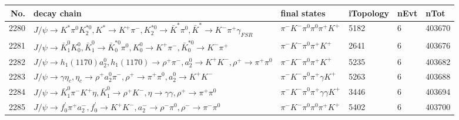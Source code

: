 \begin{table}[htbp] 
\begin{center}
\begin{small}
\begin{tabular}{rlllll}\hline\hline
 No. & decay chain & final states &  iTopology & nEvt & nTot \\\hline
2280&$J/\psi       \rightarrow K^{*}          \pi^{0}        K_2^{*0}       , K^{*}           \rightarrow K^{+}          \pi^{-}        , K_2^{*0}        \rightarrow \bar{K}^{*}   \pi^{0}        , \bar{K}^{*}    \rightarrow K^{-}          \pi^{+}        \gamma_{FSR} $&$\pi^{-}        K^{-}          \pi^{0}        \pi^{0}        \pi^{+}        K^{+}          $& 5182&    6&403670\\
2281&$J/\psi       \rightarrow \bar{K}_1^{0} K_0^{0}        , \bar{K}_1^{0}  \rightarrow \bar{K}_0^{*0}\pi^{0}        , K_0^{0}         \rightarrow K^{+}          \pi^{-}        , \bar{K}_0^{*0} \rightarrow K^{-}          \pi^{+}        $&$\pi^{-}        K^{-}          \pi^{0}        \pi^{+}        K^{+}          $& 2641&    6&403676\\
2282&$J/\psi       \rightarrow h_{1}(1170)    a_{2}^{0}      , h_{1}(1170)     \rightarrow \rho^{+}      \pi^{-}        , a_{2}^{0}       \rightarrow K^{+}          K^{-}          , \rho^{+}       \rightarrow \pi^{+}        \pi^{0}        $&$\pi^{-}        K^{-}          \pi^{0}        \pi^{+}        K^{+}          $& 5235&    6&403682\\
2283&$J/\psi       \rightarrow \gamma       \eta_{c}    , \eta_{c}     \rightarrow \rho^{+}      a_{2}^{0}      \pi^{-}        , \rho^{+}       \rightarrow \pi^{+}        \pi^{0}        , a_{2}^{0}       \rightarrow K^{+}          K^{-}          $&$\pi^{-}        K^{-}          \pi^{0}        \pi^{+}        \gamma       K^{+}          $& 5263&    6&403688\\
2284&$J/\psi       \rightarrow \bar{K}_1^{0} \pi^{-}        K^{+}          \eta          , \bar{K}_1^{0}  \rightarrow \rho^{+}      K^{-}          , \eta           \rightarrow \gamma       \gamma       , \rho^{+}       \rightarrow \pi^{+}        \pi^{0}        $&$\pi^{-}        K^{-}          \pi^{0}        \pi^{+}        \gamma       \gamma       K^{+}          $& 3446&    6&403694\\
2285&$J/\psi       \rightarrow f^{'}_{0}     \pi^{+}        a_{2}^{-}      , f^{'}_{0}      \rightarrow K^{+}          K^{-}          , a_{2}^{-}       \rightarrow \rho^{-}      \pi^{0}        , \rho^{-}       \rightarrow \pi^{-}        \pi^{0}        $&$\pi^{-}        K^{-}          \pi^{0}        \pi^{0}        \pi^{+}        K^{+}          $& 5402&    6&403700\\

\end{tabular}
\end{small}
\end{center}
\end{table}
